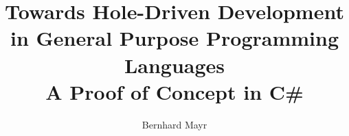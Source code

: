 \documentclass[master,english,smartquotes]{hgbthesis}
\begin{document}


\title{%
  Towards Hole-Driven Development in General Purpose Programming Languages \\
  \large A Proof of Concept in C\#}
\author{Bernhard Mayr}





\frontmatter                                   %

\maketitle
\tableofcontents

\listoftodos




\mainmatter                                    %









%
%
%
%
%
%
%
\end{document}
